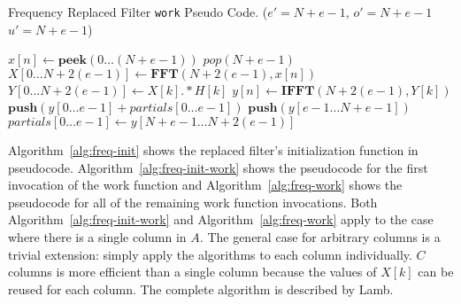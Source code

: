 \begin{algorithm}
  \caption{Frequency Replaced Filter {\tt work} Pseudo Code. 
    ($e'=N+e-1$, $o'=N+e-1$ $u'=N+e-1$)\label{alg:freq-work}}
  \begin{algorithmic}
    \STATE $x[n] \leftarrow \mathbf{peek}(0 \dots (N+e-1))$
    \STATE $pop(N+e-1)$
    \STATE $X[0 \dots N+2(e-1)] \leftarrow \mathbf{FFT} (N+2(e-1), x[n])$
    \STATE $Y[0 \dots N+2(e-1)] \leftarrow X[k] .* H[k]$
    \STATE $y[n] \leftarrow \mathbf{IFFT}(N+2(e-1), Y[k])$
    \STATE $\mathbf{push}(y[0 \dots e-1] + partials[0 \dots e-1])$
    \STATE $\mathbf{push}(y[e-1 \dots N+e-1])$
    \STATE $partials[0 \dots e-1] \leftarrow y[N+e-1 \dots N+2(e-1)]$
  \end{algorithmic}
\end{algorithm}

Algorithm~\ref{alg:freq-init} shows the replaced filter's initialization
function in pseudocode. Algorithm~\ref{alg:freq-init-work} shows the 
pseudocode for the first invocation of the work function and
Algorithm~\ref{alg:freq-work} shows the pseudocode for all of the 
remaining work function invocations. Both Algorithm~\ref{alg:freq-init-work}
and Algorithm~\ref{alg:freq-work} apply to the case where there is a single
column in $A$. The general case for arbitrary columns is a trivial extension:
simply apply the algorithms to each column individually. $C$ columns
is more efficient than a single column because the values of $X[k]$ can 
be reused for each column. The complete algorithm is described by 
Lamb\cite{lamb-thesis}. 



